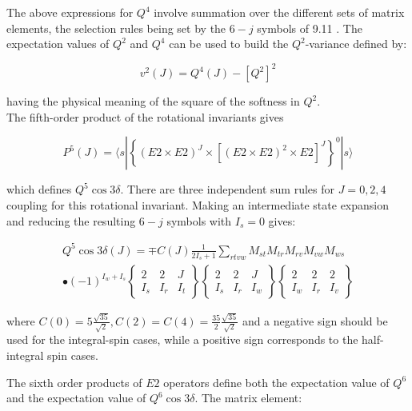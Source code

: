 \documentclass[10pt]{article}
\begin{document}
The above expressions for $Q^{4}$ involve summation over the different sets of matrix elements, the selection rules being set by the $6-j$ symbols of 9.11 . The expectation values of $Q^{2}$ and $Q^{4}$ can be used to build the $Q^{2}$-variance defined by:


\begin{equation*}
v^{2}(J)=Q^{4}(J)-\left[Q^{2}\right]^{2} \tag{9.13}
\end{equation*}


having the physical meaning of the square of the softness in $Q^{2}$.\\
The fifth-order product of the rotational invariants gives


\begin{equation*}
P^{5}(J)=\langle s|\left\{(E 2 \times E 2)^{J} \times\left[(E 2 \times E 2)^{2} \times E 2\right]^{J}\right\}^{0}|s\rangle \tag{9.14}
\end{equation*}


which defines $Q^{5} \cos 3 \delta$. There are three independent sum rules for $J=0,2,4$ coupling for this rotational invariant. Making an intermediate state expansion and reducing the resulting $6-j$ symbols with $I_{s}=0$ gives:


\begin{gather*}
Q^{5} \cos 3 \delta(J)=\mp C(J) \frac{1}{2 I_{s}+1} \sum_{r t v w} M_{s t} M_{t r} M_{r v} M_{v w} M_{w s} \\
\bullet(-1)^{I_{w}+I_{s}}\left\{\begin{array}{ccc}
2 & 2 & J \\
I_{s} & I_{r} & I_{t}
\end{array}\right\}\left\{\begin{array}{ccc}
2 & 2 & J \\
I_{s} & I_{r} & I_{w}
\end{array}\right\}\left\{\begin{array}{ccc}
2 & 2 & 2 \\
I_{w} & I_{r} & I_{v}
\end{array}\right\} \tag{9.15}
\end{gather*}


where $C(0)=5 \frac{\sqrt{35}}{\sqrt{2}}, C(2)=C(4)=\frac{35}{2} \frac{\sqrt{35}}{\sqrt{2}}$ and a negative sign should be used for the integral-spin cases, while a positive sign corresponds to the half-integral spin cases.

The sixth order products of $E 2$ operators define both the expectation value of $Q^{6}$ and the expectation value of $Q^{6} \cos 3 \delta$. The matrix element:
\end{document}
